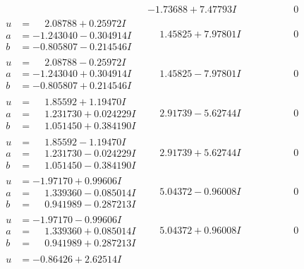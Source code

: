 \documentclass[1p]{elsarticle_modified}
\theoremstyle{definition}
\begin{document}
$$\begin{array}{c|c|c}
 & -1.73688 + 7.47793 I & \phantom{-0.000000 } 0 \\ \hline\begin{aligned}
u &= \phantom{-}2.08788 + 0.25972 I \\
a &= -1.243040 - 0.304914 I \\
b &= -0.805807 - 0.214546 I\end{aligned}
 & \phantom{-}1.45825 + 7.97801 I & \phantom{-0.000000 } 0 \\ \hline\begin{aligned}
u &= \phantom{-}2.08788 - 0.25972 I \\
a &= -1.243040 + 0.304914 I \\
b &= -0.805807 + 0.214546 I\end{aligned}
 & \phantom{-}1.45825 - 7.97801 I & \phantom{-0.000000 } 0 \\ \hline\begin{aligned}
u &= \phantom{-}1.85592 + 1.19470 I \\
a &= \phantom{-}1.231730 + 0.024229 I \\
b &= \phantom{-}1.051450 + 0.384190 I\end{aligned}
 & \phantom{-}2.91739 - 5.62744 I & \phantom{-0.000000 } 0 \\ \hline\begin{aligned}
u &= \phantom{-}1.85592 - 1.19470 I \\
a &= \phantom{-}1.231730 - 0.024229 I \\
b &= \phantom{-}1.051450 - 0.384190 I\end{aligned}
 & \phantom{-}2.91739 + 5.62744 I & \phantom{-0.000000 } 0 \\ \hline\begin{aligned}
u &= -1.97170 + 0.99606 I \\
a &= \phantom{-}1.339360 - 0.085014 I \\
b &= \phantom{-}0.941989 - 0.287213 I\end{aligned}
 & \phantom{-}5.04372 - 0.96008 I & \phantom{-0.000000 } 0 \\ \hline\begin{aligned}
u &= -1.97170 - 0.99606 I \\
a &= \phantom{-}1.339360 + 0.085014 I \\
b &= \phantom{-}0.941989 + 0.287213 I\end{aligned}
 & \phantom{-}5.04372 + 0.96008 I & \phantom{-0.000000 } 0 \\ \hline\begin{aligned}
u &= -0.86426 + 2.62514 I \\

\end{aligned}
\end{array}$$
\end{document}
